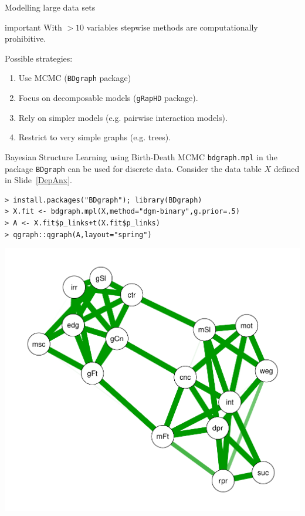 \documentclass[11pt,handout,aspectratio=169,dvipsnames]{beamer}
\begin{document}
\begin{frame}{Modelling large data sets}
		\begin{beamercolorbox}[wd=\paperwidth,sep=3pt]{important}
With $>10$ variables stepwise methods are computationally prohibitive. 
	\end{beamercolorbox}
	\bigskip
	
Possible strategies:\\[.3cm]
\begin{enumerate}
	\item Use MCMC (\texttt{BDgraph} package)
	\item Focus on \alert{decomposable models} (\texttt{gRapHD} package).\\[.3cm]
	\item Rely on simpler models (e.g. pairwise interaction models). \\[.3cm]
	\item Restrict to very simple graphs (e.g. trees).
\end{enumerate}
\end{frame}

\begin{frame}{Bayesian Structure Learning using Birth-Death MCMC}
\texttt{bdgraph.mpl} in the package \texttt{BDgraph} can be used for discrete data. Consider the data table $X$ defined in Slide~\ref{DepAnx}.
\begin{lstlisting}
> install.packages("BDgraph"); library(BDgraph)
> X.fit <- bdgraph.mpl(X,method="dgm-binary",g.prior=.5)
> A <- X.fit$p_links+t(X.fit$p_links)
> qgraph::qgraph(A,layout="spring")
\end{lstlisting}
\begin{center}
	\includegraphics[scale=.4]{pics/BDgraphDA}
\end{center}
\end{frame}
\end{document}

